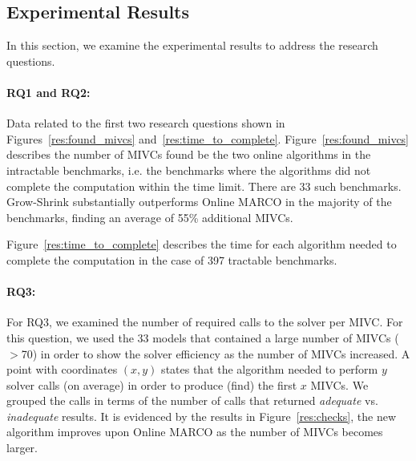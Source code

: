 \subsection{Experimental Results}
In this section, we examine the experimental results to address the research questions.

\paragraph{RQ1 and RQ2:}
Data related to the first two research questions   shown in Figures~\ref{res:found_mivcs} and~\ref{res:time_to_complete}.
Figure~\ref{res:found_mivcs} describes the number of MIVCs found be the two online algorithms in the intractable benchmarks, i.e. the benchmarks where the algorithms did not complete the computation within the time limit. There are 33 such benchmarks.
 Grow-Shrink  substantially outperforms Online MARCO in the majority of the benchmarks, finding an average of 55\% additional MIVCs.

Figure~\ref{res:time_to_complete} describes the time for each algorithm needed to complete the computation in the case of 397 tractable benchmarks. 



\paragraph{RQ3:}  For RQ3, we examined the number of required calls to the solver per MIVC.  For this question, we used the 33 models that contained a large number of MIVCs ($>$70) in order to show the solver efficiency as the number of MIVCs increased.  A point with coordinates $(x,y)$ states that the algorithm needed to perform $y$ solver calls (on average) in order to produce (find) the first $x$ MIVCs. We grouped the calls in terms of the number of calls that returned {\em adequate} vs. {\em inadequate} results.  It is evidenced by the results in Figure~\ref{res:checks}, the new algorithm improves upon Online MARCO as the number of MIVCs becomes larger.

